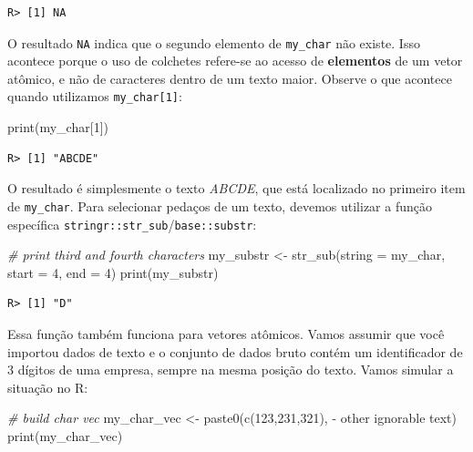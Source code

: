 \documentclass[
  11pt,
]{book}
\newenvironment{Shaded}{\begin{snugshade}}{\end{snugshade}}
\newcommand{\AttributeTok}[1]{\textcolor[rgb]{0.61,0.61,0.61}{#1}}
\newcommand{\CommentTok}[1]{\textcolor[rgb]{0.37,0.37,0.37}{\textit{#1}}}
\newcommand{\DecValTok}[1]{\textcolor[rgb]{0.06,0.06,0.06}{#1}}
\newcommand{\FunctionTok}[1]{\textcolor[rgb]{0,0,0}{#1}}
\newcommand{\NormalTok}[1]{#1}
\newcommand{\OtherTok}[1]{\textcolor[rgb]{0.37,0.37,0.37}{#1}}
\newcommand{\StringTok}[1]{\textcolor[rgb]{0.5,0.5,0.5}{#1}}
\begin{document}
\begin{verbatim}
R> [1] NA
\end{verbatim}

O resultado \texttt{NA} indica que o segundo elemento de \texttt{my\_char} não existe. Isso acontece porque o uso de colchetes refere-se ao acesso de \textbf{elementos} de um vetor atômico, e não de caracteres dentro de um texto maior. Observe o que acontece quando utilizamos \texttt{my\_char{[}1{]}}:

\begin{Shaded}
\begin{Highlighting}[]
\FunctionTok{print}\NormalTok{(my\_char[}\DecValTok{1}\NormalTok{])}
\end{Highlighting}
\end{Shaded}

\begin{verbatim}
R> [1] "ABCDE"
\end{verbatim}

O resultado é simplesmente o texto \emph{ABCDE}, que está localizado no primeiro item de \texttt{my\_char}. Para selecionar pedaços de um texto, devemos utilizar a função específica \texttt{stringr::str\_sub}/\texttt{base::substr}: 

\begin{Shaded}
\begin{Highlighting}[]
\CommentTok{\# print third and fourth characters}
\NormalTok{my\_substr }\OtherTok{\textless{}{-}} \FunctionTok{str\_sub}\NormalTok{(}\AttributeTok{string =}\NormalTok{ my\_char,}
                     \AttributeTok{start =} \DecValTok{4}\NormalTok{,}
                     \AttributeTok{end =} \DecValTok{4}\NormalTok{)}
\FunctionTok{print}\NormalTok{(my\_substr)}
\end{Highlighting}
\end{Shaded}

\begin{verbatim}
R> [1] "D"
\end{verbatim}

Essa função também funciona para vetores atômicos. Vamos assumir que você importou dados de texto e o conjunto de dados bruto contém um identificador de 3 dígitos de uma empresa, sempre na mesma posição do texto. Vamos simular a situação no R:

\begin{Shaded}
\begin{Highlighting}[]
\CommentTok{\# build char vec}
\NormalTok{my\_char\_vec }\OtherTok{\textless{}{-}} \FunctionTok{paste0}\NormalTok{(}\FunctionTok{c}\NormalTok{(}\StringTok{\textquotesingle{}123\textquotesingle{}}\NormalTok{,}\StringTok{\textquotesingle{}231\textquotesingle{}}\NormalTok{,}\StringTok{\textquotesingle{}321\textquotesingle{}}\NormalTok{),}
                      \StringTok{\textquotesingle{} {-} other ignorable text\textquotesingle{}}\NormalTok{)}
\FunctionTok{print}\NormalTok{(my\_char\_vec)}
\end{Highlighting}
\end{Shaded}
\end{document}
